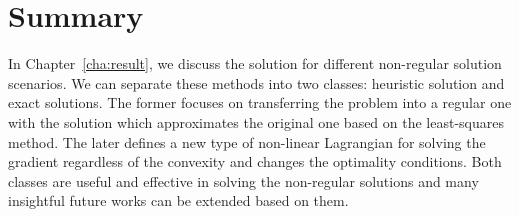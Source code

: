 \section{Summary}
In Chapter~\ref{cha:result}, we discuss the solution for different non-regular solution scenarios. We can separate these methods into two classes: heuristic solution and exact solutions. The former focuses on transferring the problem into a regular one with the solution which approximates the original one based on the least-squares method. The later defines a new type of non-linear Lagrangian for solving the gradient regardless of the convexity and changes the optimality conditions. Both classes are useful and effective in solving the non-regular solutions and many insightful future works can be extended based on them. 
